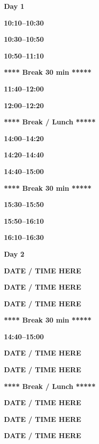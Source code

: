 \documentclass[12pt]{extbook}
\newcommand{\dayheader}[1]{
\clearpage
\begin{center}
\Large\bfseries Day #1
\end{center}
\bigskip}
\newcommand{\breaktime}[1]{
\bigskip
\begin{center}
\Large\bfseries ***** Break #1 *****
\end{center}
\bigskip}
\newcommand{\abstract}[2]{{
\bigskip
\begin{center}
\bfseries #1
\end{center}}
\par
}
\begin{document}



\dayheader{1}


\abstract{10:10--10:30}{abstracts/Kipfer} %

\abstract{10:30--10:50}{abstracts/Daskalopoulou} %
\abstract{10:50--11:10}{abstracts/Kimani} %


\breaktime{30 min}


\abstract{11:40--12:00}{abstracts/Mtili} %

\abstract{12:00--12:20}{abstracts/Giroud} %


\breaktime{ / Lunch}


\abstract{14:00--14:20}{abstracts/Roques} %
\abstract{14:20--14:40}{abstracts/Lightfoot} %
\abstract{14:40--15:00}{abstracts/Dutoit} %

\breaktime{30 min}

\abstract{15:30--15:50}{abstracts/Strauch_Zimmer} %
\abstract{15:50--16:10}{abstracts/Ortega} %
\abstract{16:10--16:30}{abstracts/Finger} %

\dayheader{2}

\abstract{DATE / TIME HERE}{abstracts/Engelhardt} %
\abstract{DATE / TIME HERE}{abstracts/Picard} %
\abstract{DATE / TIME HERE}{abstracts/Hillegonds} %

\breaktime{30 min}

\abstract{14:40--15:00}{abstracts/Tomonaga} %
\abstract{DATE / TIME HERE}{abstracts/Kim} %
\abstract{DATE / TIME HERE}{abstracts/Jacops} %


\breaktime{ / Lunch}

\abstract{DATE / TIME HERE}{abstracts/vanLeeuw} %
\abstract{DATE / TIME HERE}{abstracts/Currle} %
\abstract{DATE / TIME HERE}{abstracts/Wang} %
\end{document}

